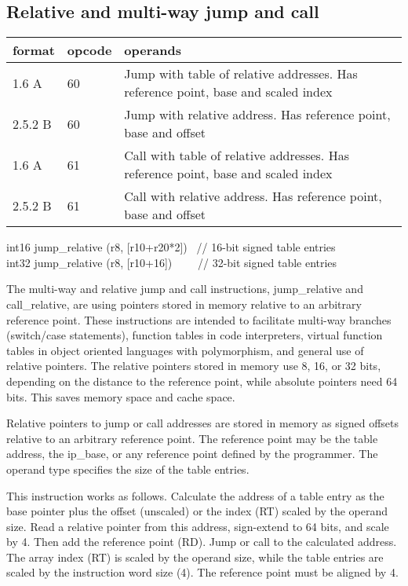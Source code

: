 \documentclass[forwardcom.tex]{subfiles}
\begin{document}
\subsection{Relative and multi-way jump and call}
\label{table:multiwayJumpCallInstructions}
\begin{tabular}{|p{14mm}|p{12mm}|p{110mm}|}
\hline
\bfseries format & \bfseries opcode & \bfseries operands \\ \hline
1.6 A   & 60 & Jump with table of relative addresses. \linebreak Has reference point, base and scaled index  \\ \hline
2.5.2 B & 60 & Jump with relative address. \linebreak Has reference point, base and offset  \\ \hline
1.6 A   & 61 & Call with table of relative addresses. \linebreak Has reference point, base and scaled index    \\ \hline
2.5.2 B & 61 & Call with relative address. \linebreak Has reference point, base and offset \\ \hline
\end{tabular}
\vv

{\ttfamily
int16 jump\_relative (r8, [r10+r20*2]) \ // 16-bit signed table entries \\
int32 jump\_relative (r8, [r10+16]) \ \ \ \ // 32-bit signed table entries
}
\vv

\label{relativeJumpInstruction}
The multi-way and relative jump and call instructions, jump\_relative and call\_relative, are using pointers stored in memory relative to an arbitrary reference point. 
These instructions are intended to facilitate multi-way branches 
(switch/case statements), function tables in code interpreters, virtual function tables in object oriented languages with polymorphism, and general use of relative pointers. The relative pointers stored in memory use 8, 16, or 32 bits, depending on the distance to the reference point, while absolute pointers need 64 bits. This saves memory space and cache space. 
\vv

Relative pointers to jump or call addresses are stored in memory as signed offsets relative to an arbitrary reference point. The reference point may be the table address, the ip\_base, or any reference point defined by the programmer. The operand type specifies the size of the table entries.
\vv

This instruction works as follows. Calculate the address of a table entry as the base pointer plus the offset (unscaled) or the index (RT) scaled by the operand size. Read a relative pointer from this address, sign-extend to 64 bits, and scale by 4. Then add the reference point (RD). Jump or call to the calculated address. The array index (RT) is scaled by the operand size, while the table entries are scaled by the instruction word size (4). The reference point must be aligned by 4.
\vv
\end{document}
